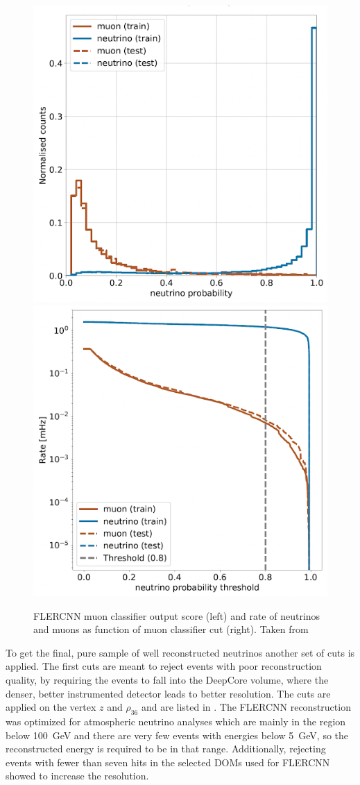 \begin{figure}
\includegraphics[width=0.49\linewidth]{figures/simulation_and_processing/flercnn/flercnn_muon_classifier.png}
\includegraphics[width=0.49\linewidth]{figures/simulation_and_processing/flercnn/flercnn_muon_classifier_rate_vs_threshold.png}
\caption[FLERCNN muon classifier probability distributions]{FLERCNN muon classifier output score (left) and rate of neutrinos and muons as function of muon classifier cut (right). Taken from \cite{flercnn_analysis_internal_note}}
\end{figure}


To get the final, pure sample of well reconstructed neutrinos another set of cuts is applied. The first cuts are meant to reject events with poor reconstruction quality, by requiring the events to fall into the DeepCore volume, where the denser, better instrumented detector leads to better resolution. The cuts are applied on the vertex $z$ and $\rho_{36}$ and are listed in . The FLERCNN reconstruction was optimized for atmospheric neutrino analyses which are mainly in the region below \SI{100}{\giga\electronvolt} and there are very few events with energies below \SI{5}{\giga\electronvolt}, so the reconstructed energy is required to be in that range. Additionally, rejecting events with fewer than seven hits in the selected DOMs used for FLERCNN showed to increase the resolution.

